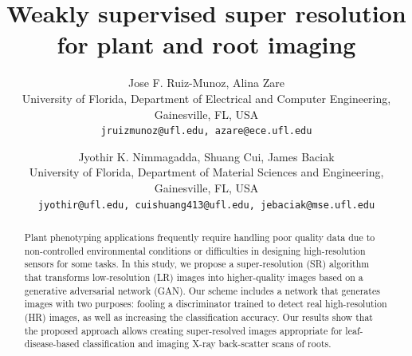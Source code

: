 \documentclass[10pt,twocolumn,letterpaper]{article}
\begin{document}
\title{Weakly supervised super resolution for plant and root imaging}

\author{Jose F. Ruiz-Munoz, Alina Zare \\
University of Florida, Department of Electrical and Computer Engineering, Gainesville, FL, USA\\
{\tt\small jruizmunoz@ufl.edu, azare@ece.ufl.edu}
\and
Jyothir K. Nimmagadda, Shuang Cui, James Baciak \\
University of Florida, Department of Material Sciences and Engineering, Gainesville, FL, USA\\
{\tt\small jyothir@ufl.edu, cuishuang413@ufl.edu, jebaciak@mse.ufl.edu}
}

\maketitle

\begin{abstract}
   Plant phenotyping applications frequently require handling poor quality data due to non-controlled environmental conditions or difficulties in designing high-resolution sensors for some tasks. In this study, we propose a super-resolution (SR) algorithm that transforms low-resolution (LR) images into higher-quality images based on a generative adversarial network (GAN). Our scheme includes a network that generates images with two purposes: fooling a discriminator trained to detect real high-resolution (HR) images, as well as increasing the classification accuracy. Our results show that the proposed approach allows creating super-resolved images appropriate for leaf-disease-based classification and imaging X-ray back-scatter scans of roots.
\end{abstract}

\end{document}
